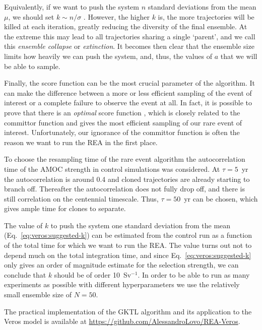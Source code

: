 Equivalently, if we want to push the system $n$ standard deviations from the mean $\mu$, we should set $k \sim n/\sigma$ \cite{PRI24}. However, the higher $k$ is, the more trajectories will be killed at each iteration, greatly reducing the diversity of the final ensemble. At the extreme this may lead to all trajectories sharing a single `parent', and we call this \emph{ensemble collapse} or \emph{extinction}. It becomes then clear that the ensemble size limits how heavily we can push the system, and, thus, the values of $a$ that we will be able to sample.

Finally, the score function can be the most crucial parameter of the algorithm. It can make the difference between a more or less efficient sampling of the event of interest or a complete failure to observe the event at all.
In fact, it is possible to prove that there is an \emph{optimal} score function \cite{CHR20}, which is closely related to the committor function and gives the most efficient sampling of our rare event of interest.
Unfortunately, our ignorance of the committor function is often the reason we want to run the REA in the first place.

To choose the resampling time of the rare event algorithm the autocorrelation time of the AMOC strength in control simulations was considered. At $\tau = 5$~yr the autocorrelation is around 0.4 and cloned trajectories are already starting to branch off.
Thereafter the autocorrelation does not fully drop off, and there is still correlation on the centennial timescale. Thus, $\tau = 50$~yr can be chosen, which gives ample time for clones to separate.

The value of $k$ to push the system one standard deviation from the mean (Eq.~\ref{eq:veros:suggested-k}) can be estimated from the control run as a function of the total time for which we want to run the REA. The value turns out not to depend much on the total integration time, and since Eq.~\ref{eq:veros:suggested-k} only gives an order of magnitude estimate for the selection strength, we can conclude that $k$ should be of order 10~Sv$^{-1}$. In order to be able to run as many experiments as possible with different hyperparameters we use the relatively small ensemble size of $N = 50$.


The practical implementation of the GKTL algorithm and its application to the Veros model is available at \url{https://github.com/AlessandroLovo/REA-Veros}.
